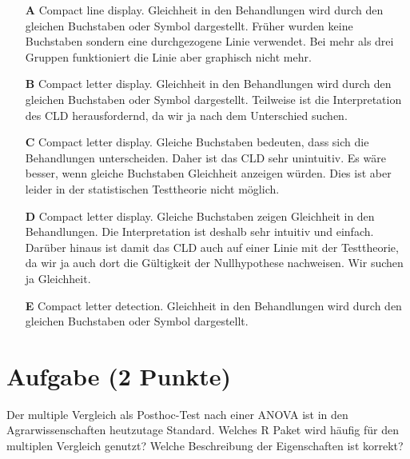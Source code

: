 \documentclass[a4paper, 9pt]{scrartcl}\usepackage[]{graphicx}\usepackage[]{xcolor}
\begin{document}
\begin{enumerate}
\item [\textbf{A} \msquare] Compact line display. Gleichheit in den Behandlungen wird durch den gleichen Buchstaben oder Symbol dargestellt. Früher wurden keine Buchstaben sondern eine durchgezogene Linie verwendet. Bei mehr als drei Gruppen funktioniert die Linie aber graphisch nicht mehr.
\item [\textbf{B} \msquare] Compact letter display. Gleichheit in den Behandlungen wird durch den gleichen Buchstaben oder Symbol dargestellt. Teilweise ist die Interpretation des CLD herausfordernd, da wir ja nach dem Unterschied suchen.
\item [\textbf{C} \msquare] Compact letter display. Gleiche Buchstaben bedeuten, dass sich die Behandlungen unterscheiden. Daher ist das CLD sehr unintuitiv. Es wäre besser, wenn gleiche Buchstaben Gleichheit anzeigen würden. Dies ist aber leider in der statistischen Testtheorie nicht möglich.
\item [\textbf{D} \msquare] Compact letter display. Gleiche Buchstaben zeigen Gleichheit in den Behandlungen. Die Interpretation ist deshalb sehr intuitiv und einfach. Darüber hinaus ist damit das CLD auch auf einer Linie mit der Testtheorie, da wir ja auch dort die Gültigkeit der Nullhypothese nachweisen. Wir suchen ja Gleichheit.
\item [\textbf{E} \msquare] Compact letter detection. Gleichheit in den Behandlungen wird durch den gleichen Buchstaben oder Symbol dargestellt.
\end{enumerate}

\section{Aufgabe \hfill (2 Punkte)}




Der multiple Vergleich als Posthoc-Test nach einer ANOVA ist in den Agrarwissenschaften heutzutage Standard. Welches R Paket wird häufig für den multiplen Vergleich genutzt? Welche Beschreibung der Eigenschaften ist korrekt?
\end{document}
